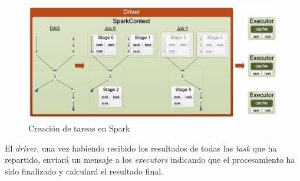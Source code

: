 \begin{figure}[h]
	\centering
	\includegraphics[width=1\textwidth]{Ilustraciones/spark_task_creation.png}
	\caption{Creación de tareas en Spark}
	\label{fig:spark_task_creation}
\end{figure}

El \textit{driver}, una vez habiendo recibido los resultados de todas las \textit{task} que ha repartido, enviará un mensaje a los \textit{executors}
indicando que el procesamiento ha sido finalizado y calculará el resultado final.